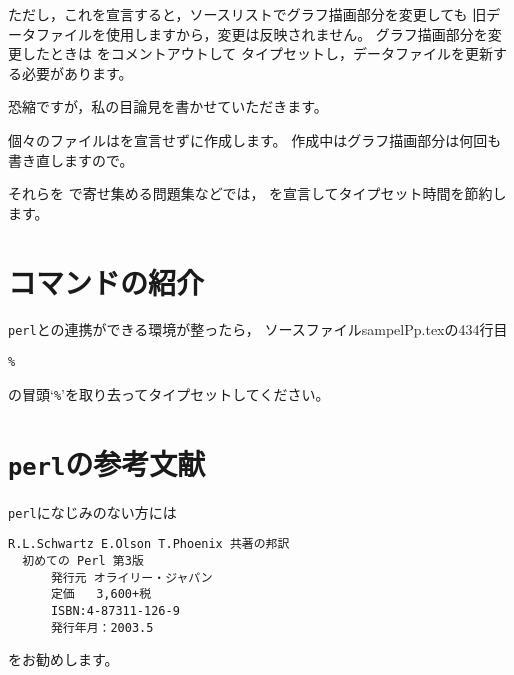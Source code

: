 \documentclass[a4j,fleqn]{jarticle}
\begin{document}
ただし，これを宣言すると，ソースリストでグラフ描画部分を変更しても
旧データファイルを使用しますから，変更は反映されません。
グラフ描画部分を変更したときは  をコメントアウトして
タイプセットし，データファイルを更新する必要があります。

恐縮ですが，私の目論見を書かせていただきます。

個々のファイルはを宣言せずに作成します。
作成中はグラフ描画部分は何回も書き直しますので。

それらを で寄せ集める問題集などでは，
を宣言してタイプセット時間を節約します。
\fi
\clearpage

\section{コマンドの紹介}
\texttt{perl}との連携ができる環境が整ったら，
ソースファイル\textsf{sampelPp.tex}の434行目
\begin{verbatim}
%
\end{verbatim}
の冒頭`\verb+%+'を取り去ってタイプセットしてください。
\fi



\section{\texttt{perl}の参考文献}
\texttt{perl}になじみのない方には

\begin{jquote}
\begin{verbatim}
R.L.Schwartz E.Olson T.Phoenix 共著の邦訳
  初めての Perl 第3版
      発行元 オライリー・ジャパン
      定価   3,600+税
      ISBN:4-87311-126-9
      発行年月：2003.5
\end{verbatim}
\end{jquote}
をお勧めします。
\end{document}
